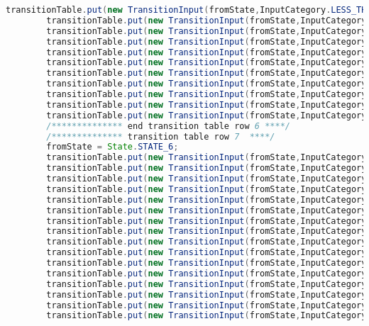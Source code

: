 \begin{lstlisting}[basicstyle=\miniscule,language=Java,caption=Implementation of transition table,label=listing:transition table]
		transitionTable.put(new TransitionInput(fromState,InputCategory.LESS_THAN), State.STATE_ERROR);
		transitionTable.put(new TransitionInput(fromState,InputCategory.GREATER_THAN), State.STATE_ERROR);
		transitionTable.put(new TransitionInput(fromState,InputCategory.PLUS), State.STATE_ERROR);
		transitionTable.put(new TransitionInput(fromState,InputCategory.HYPHEN_MINUS), State.STATE_ERROR);
		transitionTable.put(new TransitionInput(fromState,InputCategory.EQUAL), State.STATE_ERROR);
		transitionTable.put(new TransitionInput(fromState,InputCategory.EXCLAMATION_MARK), State.STATE_ERROR);
		transitionTable.put(new TransitionInput(fromState,InputCategory.DOT), State.STATE_ERROR);
		transitionTable.put(new TransitionInput(fromState,InputCategory.SINGLE_QUOTE), State.STATE_ERROR);
		transitionTable.put(new TransitionInput(fromState,InputCategory.PUNCT), State.STATE_ERROR);
		transitionTable.put(new TransitionInput(fromState,InputCategory.OTHER_PRINTABLE), State.STATE_ERROR);
		transitionTable.put(new TransitionInput(fromState,InputCategory.LINE_FEED), State.STATE_ERROR);
		/************** end transition table row 6 ****/
		/************** transition table row 7  ****/
		fromState = State.STATE_6;
		transitionTable.put(new TransitionInput(fromState,InputCategory.LETTER), fromState);
		transitionTable.put(new TransitionInput(fromState,InputCategory.DIGIT), fromState);
		transitionTable.put(new TransitionInput(fromState,InputCategory.UNDERSCORE), fromState);
		transitionTable.put(new TransitionInput(fromState,InputCategory.SLASH_DIVIDE), fromState);
		transitionTable.put(new TransitionInput(fromState,InputCategory.ASTERISK), fromState);
		transitionTable.put(new TransitionInput(fromState,InputCategory.LESS_THAN), fromState);
		transitionTable.put(new TransitionInput(fromState,InputCategory.GREATER_THAN), fromState);
		transitionTable.put(new TransitionInput(fromState,InputCategory.PLUS), fromState);
		transitionTable.put(new TransitionInput(fromState,InputCategory.HYPHEN_MINUS), fromState);
		transitionTable.put(new TransitionInput(fromState,InputCategory.EQUAL), fromState);
		transitionTable.put(new TransitionInput(fromState,InputCategory.EXCLAMATION_MARK), fromState);
		transitionTable.put(new TransitionInput(fromState,InputCategory.DOT), fromState);
		transitionTable.put(new TransitionInput(fromState,InputCategory.SINGLE_QUOTE), fromState);
		transitionTable.put(new TransitionInput(fromState,InputCategory.PUNCT), fromState);
		transitionTable.put(new TransitionInput(fromState,InputCategory.OTHER_PRINTABLE), fromState);
		transitionTable.put(new TransitionInput(fromState,InputCategory.LINE_FEED), State.STATE_ERROR);

\end{lstlisting}
